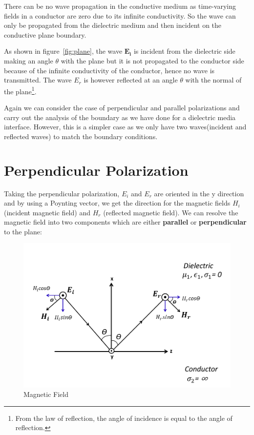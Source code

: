 There can be no wave propagation in the conductive medium as time-varying fields in a conductor are zero due to its infinite conductivity. So the wave can only be propagated from the dielectric medium and then incident on the conductive plane boundary.

As shown in figure~\ref{fig:plane}, the wave $\boldsymbol{E_i}$  is incident from the dielectric side making an angle $ \theta $ with the plane but it is not propagated to the conductor side because of the infinite conductivity of the conductor, hence no wave is transmitted. The wave $E_r$ is however reflected at an angle $ \theta $ with the normal of the plane\footnote{
From the law of reflection, the angle of incidence is equal to the angle of reflection.
}.

Again we can consider the case of perpendicular and parallel polarizations and carry out the analysis of the boundary as we have done for a dielectric media interface. However, this is a simpler case as we only have two waves(incident and reflected waves) to match the boundary conditions.

\section{Perpendicular Polarization}
Taking the perpendicular polarization, $E_i$ and $E_r$ are oriented in the y direction and by using a Poynting vector, we get the direction for the magnetic fields $H_i$ (incident magnetic field) and $H_r$ (reflected magnetic field). We can resolve the magnetic field into two components which are either \textbf{parallel} or \textbf{perpendicular} to the plane:

\begin{figure}[h]
\centering
\includegraphics[width=1.02\linewidth]{./graphics/perpendicular_polarization_at_dielectric_conductor_interface}
\caption{Magnetic Field}
\label{fig:fields}
\end{figure}

